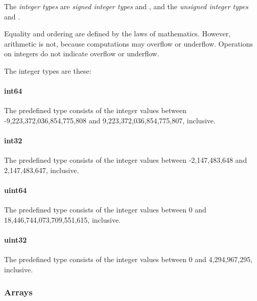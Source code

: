 \documentclass{article}
\begin{document}
{The {\em integer types} are {\em signed integer types} \INTTHIRTYTWO{} and  \INTSIXTYFOUR{}, and the {\em unsigned integer types} \UINTTHIRTYTWO{} and \UINTSIXTYFOUR.
 
Equality and ordering are defined by the laws of mathematics. However, arithmetic is not, because computations may overflow or underflow.  Operations on integers do not indicate overflow or underflow. 


The integer types are these:
 
 \paragraph{int64}
 \label{int64}
 
 The predefined type \INTSIXTYFOUR{} consists of the integer values between -9,223,372,036,854,775,808 and 9,223,372,036,854,775,807, inclusive.
 
  \paragraph{int32}
 \label{int32}
 
The predefined type \INTTHIRTYTWO{} consists of the integer values between -2,147,483,648 and 2,147,483,647, inclusive.
 
  
 \paragraph{uint64}
 \label{uint64}
 
 The predefined type \UINTSIXTYFOUR{} consists of the integer values between 0 and 18,446,744,073,709,551,615, inclusive.
 
  \paragraph{uint32}
 \label{uint32}
 
The predefined type \UINTTHIRTYTWO{} consists of the integer values between 0 and 4,294,967,295, inclusive.
 
 \subsubsection{Arrays}
\label{arrays}

}
\end{document}
